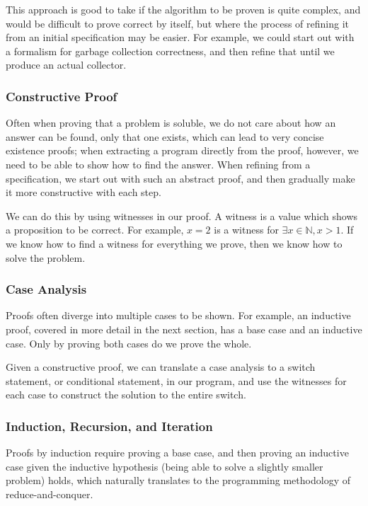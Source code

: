 This approach is good to take if the algorithm to be proven is quite
complex, and would be difficult to prove correct by itself, but where
the process of refining it from an initial specification may be
easier. For example, we could start out with a formalism for garbage
collection correctness, and then refine that until we produce an
actual collector.

\subsubsection{Constructive Proof}
\label{sec:lit-verification-extraction-constructive}

Often when proving that a problem is soluble, we do not care about how
an answer can be found, only that one exists, which can lead to very
concise existence proofs; when extracting a program directly from the
proof, however, we need to be able to show how to find the
answer. When refining from a specification, we start out with such an
abstract proof, and then gradually make it more constructive with each
step.

We can do this by using witnesses in our proof. A witness is a value
which shows a proposition to be correct. For example, $x = 2$ is a
witness for $\exists x \in \mathbb N, x > 1$. If we know how to find a
witness for everything we prove, then we know how to solve the
problem.

\subsubsection{Case Analysis}
\label{sec:lit-verification-extraction-cases}

Proofs often diverge into multiple cases to be shown. For example, an
inductive proof, covered in more detail in the next section, has a
base case and an inductive case. Only by proving both cases do we
prove the whole.

Given a constructive proof, we can translate a case analysis to a
switch statement, or conditional statement, in our program, and use
the witnesses for each case to construct the solution to the entire
switch.

\subsubsection{Induction, Recursion, and Iteration}
\label{sec:lit-verification-extraction-induction}

Proofs by induction require proving a base case, and then proving an
inductive case given the inductive hypothesis (being able to solve a
slightly smaller problem) holds, which naturally translates to the
programming methodology of reduce-and-conquer.

